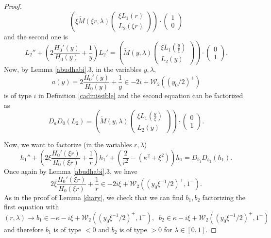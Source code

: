 \documentclass[11 pt]{amsart}
\theoremstyle{definition}
\theoremstyle{remark}
\numberwithin{equation}{section}
\begin{document}
\begin{proof}
\[     \left( \xi \widetilde{M} (\xi r, \lambda) \left(\begin{array}{c}
       \xi L_1 (r)\\
       L_2 (\xi r)
     \end{array}\right) \right) \cdot \left(\begin{array}{c}
       1\\
       0
     \end{array}\right) \]
  and the second one is
  \[ L_2'' + \left( 2 \frac{H_0' (y)}{H_0 (y)} + \frac{1}{y} \right) L_2' =
     \left( \widetilde{M} (y, \lambda) \left(\begin{array}{c}
       \xi L_1 \left( \frac{y}{\xi} \right)\\
       L_2 (y)
     \end{array}\right) \right) \cdot \left(\begin{array}{c}
       0\\
       1
     \end{array}\right) . \]
  Now, by Lemma \ref{abudhabi}.3, in the variables $y, \lambda$,
  \[ a (y) = 2 \frac{H_0' (y)}{H_0 (y)} + \frac{1}{y} \in - 2 i
     +\mathcal{W}_2 ((y_0/2)^+) \]
  is of type $i$ in Definition \ref{cadmissible} and the second equation can
  be factorized as
  \[ D_a D_0 (L_2) = \left( \widetilde{M} (y, \lambda) \left(\begin{array}{c}
       \xi L_1 \left( \frac{y}{\xi} \right)\\
       L_2 (y)
     \end{array}\right) \right) \cdot \left(\begin{array}{c}
       0\\
       1
     \end{array}\right) . \]
  
  
  Now, we want to factorize (in the variables $r, \lambda$)
  \[ h_1'' + \left( 2 \xi \frac{H_0' (\xi r)}{H_0 (\xi r)} + \frac{1}{r}
     \right) h_1' + \left( \frac{2}{r^2} - (\kappa^2 + \xi^2) \right) h_1 =
     D_{b_1} D_{b_2} (h_1) . \]
  Once again by Lemma \ref{abudhabi}.3, we have
  \[ 2 \xi \frac{H_0' (\xi r)}{H_0 (\xi r)} + \frac{1}{r} \in - 2 i \xi
     +\mathcal{W}_2 ((y_0\xi^{- 1}/2)^+, 1^-) . \]
  As in the proof of Lemma \ref{diary}, we check that we can find $b_1, b_2$
  factorizing the first equation with
  \[ (r, \lambda) \rightarrow b_1 \in - \kappa - i \xi +\mathcal{W}_2 ((y_0\xi^{-
     1}/2)^+, 1^-), \;\;b_2 \in \kappa - i \xi +\mathcal{W}_2 ((y_0\xi^{- 1}/2)^+, 1^-)
  \]
  and therefore $b_1$ is of type $< 0$ and $b_2$ is of type $> 0$ for $\lambda
  \in [0, 1]$.
  

\end{proof}
\end{document}

